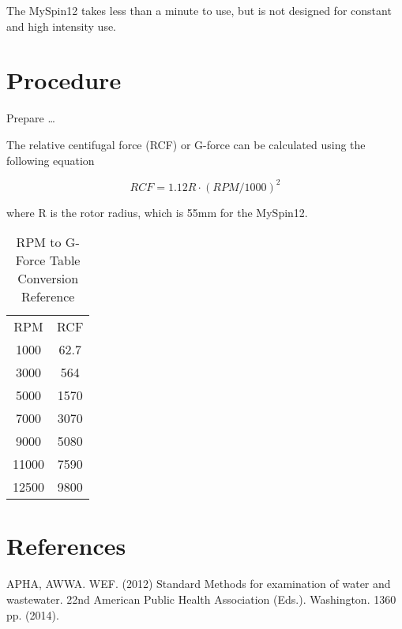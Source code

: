 \documentclass[12pt]{../SOP3_beta}
\begin{document}
\NP The MySpin12 takes less than a minute to use, but is not designed for constant and high intensity use. 

\section{Procedure}

\NP Prepare \dots

\NP

The relative centifugal force (RCF) or G-force can be calculated using the following equation

\begin{equation}
RCF = 1.12 R \cdot (RPM/1000)^2
\end{equation}

\noindent where R is the rotor radius, which is 55mm for the MySpin12.

\begin{table}[h]
\centering
\caption{RPM to G-Force Table Conversion Reference}
\begin{tabular}{cc}
RPM   &   RCF   \\
1000  &   62.7          \\
3000  &   564           \\
5000  &   1570          \\
7000  &   3070          \\
9000  &   5080          \\
11000 &   7590          \\
12500 &   9800          \\
\end{tabular}
\end{table}


\section{References}

\NP APHA, AWWA. WEF. (2012) Standard Methods for examination of water and wastewater. 22nd American Public Health Association (Eds.). Washington. 1360 pp. (2014).
\end{document}
